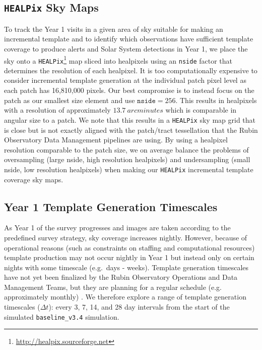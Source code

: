 \documentclass[preprint,linenumbers]{aastex631}
\newcommand{\baseline}{\texttt{baseline\_v3.4}\xspace}
\begin{document}
	\subsection{\texttt{HEALPix} Sky Maps} 
	\label{sec:ITG}
	To track the Year 1 visits in a given area of sky suitable for making an incremental template and to identify which observations have sufficient template coverage to produce alerts and Solar System detections in Year 1, we place the sky onto a \texttt{HEALPix}\footnote{\url{http://healpix.sourceforge.net}} \citep[Hierarchical Equal Area isoLatitude Pixelization; ][]{2005ApJ...622..759G} map sliced into healpixels using an \verb|nside| factor that determines the resolution of each healpixel. It is too computationally expensive to consider incremental template generation at the individual patch pixel level as each patch has 16,810,000 pixels. Our best compromise is to instead focus on the patch as our smallest size element and use $\texttt{nside}=256$. This results in healpixels with a resolution of approximately $13.7\ \si{arcminutes}$ which is comparable in angular size to a patch. %
	We note that this results in a \texttt{HEALPix} sky map grid that is close but is not exactly aligned with the patch/tract tessellation that the Rubin Observatory Data Management pipelines are using.  By using a healpixel resolution comparable to the patch size, we on average balance the problems of oversampling (large nside, high resolution healpixels) and undersampling (small nside, low resolution healpixels) when making our \texttt{HEALPix} incremental template coverage sky maps.
	
	\subsection{Year 1 Template Generation Timescales}
	\label{sec:timescales}
	As Year 1 of the survey progresses and images are taken according to the predefined survey strategy, sky coverage increases nightly. However, because of operational reasons (such as constraints on staffing and computational resources)  template production may not occur nightly in Year 1 but instead only on certain nights with some timescale (e.g.\ days - weeks). Template generation timescales have not yet been finalized by the Rubin Observatory Operations and Data Management Teams, but they are planning for a regular schedule (e.g. approximately monthly) \citep{DMTN-107,RTN-011}. We therefore explore a  range of template generation timescales ($\Delta t$): every 3, 7, 14, and 28 day intervals from the start of the simulated \baseline simulation. 
	
\end{document}
